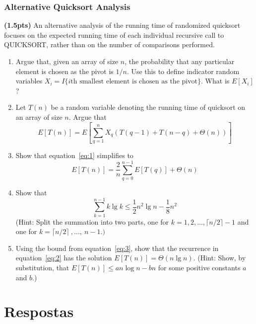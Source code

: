 \documentclass{article}
\begin{document}
\section{Alternative Quicksort Analysis} 
\textbf{(1.5pts)} An alternative analysis of the running time of randomized quicksort focuses on the expected running time of each individual recursive call to QUICKSORT, rather than on the number of comparisons performed.

\begin{enumerate}[label=(\alph*)]
  \item Argue that, given an array of size $n$, the probability that any particular element is chosen as the pivot is $1/n$. Use this to define indicator random variables $X_i = I \{i\mbox{th smallest element is chosen as the pivot}\}$. What is $E[X_i]$?
  \item Let $T(n)$ be a random variable denoting the running time of quicksort on an array of size $n$. Argue that
  \begin{equation}
    E[T(n)]=E\left[\sum_{q=1}^{n}X_q(T(q-1)+T(n-q)+\Theta(n))\right]  
    \label{eq:1}
  \end{equation}
  
  \item Show that equation~\ref{eq:1} simplifies to
  \begin{equation}
    E[T(n)] = \frac{2}{n}\sum_{q=0}^{n-1}E[T(q)] + \Theta(n)
    \label{eq:2}
  \end{equation}

  \item Show that
  \begin{equation}
    \sum_{k=1}^{n-1} k \lg k \leq \frac{1}{2}n^2\lg n - \frac{1}{8}n^2
    \label{eq:3}
  \end{equation}
  (Hint: Split the summation into two parts, one for $k=1,2, \ldots, \lceil n/2 \rceil - 1$ and \\ one for $k=\lceil n/2 \rceil~,\ldots,~n-1.)$

  \item Using the bound from equation~\ref{eq:3}, show that the recurrence in equation~\ref{eq:2} has the solution $E[T(n)]=\Theta(n\lg n)$. (Hint: Show, by substitution, that $E[T(n)] \leq an \log n - bn$ for some positive constants $a$ and $b$.)
\end{enumerate}


\pagebreak

\part*{Respostas}
\end{document}
